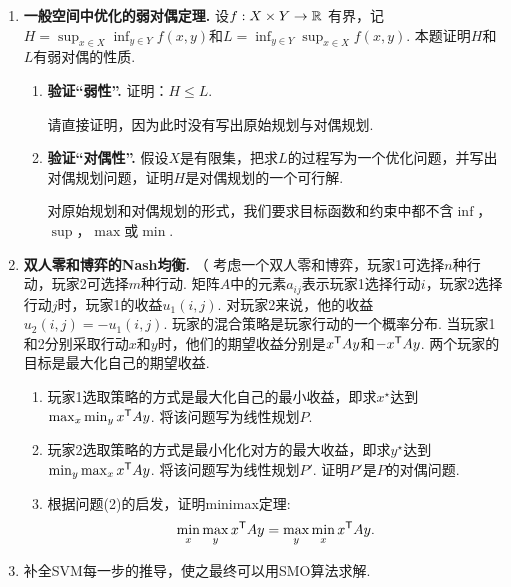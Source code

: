 \begin{enumerate}[wide, labelindent=0pt]
    \item \textbf{一般空间中优化的弱对偶定理. }设$f: X \times Y \to \mathbb{R}$ 有界，记$H = \sup_{x\in X}\inf_{y \in Y}f(x, y)$和$L = \inf_{y\in Y}\sup_{x \in X}f(x, y)$. 本题证明$H$和$L$有弱对偶的性质.
    \begin{enumerate}
        \item \textbf{验证“弱性”. }证明：$H \leq L$.
        \begin{hint}
            请直接证明，因为此时没有写出原始规划与对偶规划.
        \end{hint}
        \item \textbf{验证“对偶性”. }假设$X$是有限集，把求$L$的过程写为一个优化问题，并写出对偶规划问题，证明$H$是对偶规划的一个可行解.
        \begin{hint}
        对原始规划和对偶规划的形式，我们要求目标函数和约束中都不含$\inf$，$\sup$，$\max$或$\min$.
        \end{hint}
    \end{enumerate}
    
    \item \label{exercise:minimax-theorem}\textbf{双人零和博弈的Nash均衡. }（\cite{vonneumannTheoryGamesEconomic2007} 考虑一个双人零和博弈，玩家1可选择$n$种行动，玩家2可选择$m$种行动. 矩阵$A$中的元素$a_{ij}$表示玩家1选择行动$i$，玩家2选择行动$j$时，玩家1的收益$u_1(i,j)$. 对玩家2来说，他的收益$u_2(i,j)=-u_1(i,j)$. 玩家的混合策略是玩家行动的一个概率分布. 当玩家1和2分别采取行动$x$和$y$时，他们的期望收益分别是$x^{\mathsf{T}} Ay$和$-x^{\mathsf{T}} Ay$. 两个玩家的目标是最大化自己的期望收益.
    \begin{enumerate}
        \item 玩家1选取策略的方式是最大化自己的最小收益，即求$x^\star$达到$\max_x\min_y x^{\mathsf{T}} Ay$. 将该问题写为线性规划$P$.
        \item 玩家2选取策略的方式是最小化化对方的最大收益，即求$y^\star$达到$\min_y\max_x x^{\mathsf{T}} Ay$. 将该问题写为线性规划$P'$. 证明$P'$是$P$的对偶问题.
        \item 根据问题(2)的启发，证明minimax定理:
        \[\min_{x}\max_{y}x^{\mathsf{T}} Ay=\max_{y}\min_{x} x^{\mathsf{T}} Ay.\]
    \end{enumerate}

    \item \label{exercise:SVM-deduction} 补全SVM每一步的推导，使之最终可以用SMO算法求解.
\end{enumerate}
